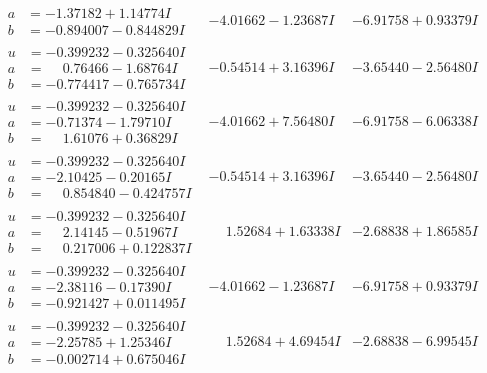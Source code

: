 \documentclass[1p]{elsarticle_modified}
\theoremstyle{definition}
\begin{document}
$$\begin{array}{c|c|c}
\begin{aligned}
a &= -1.37182 + 1.14774 I \\
b &= -0.894007 - 0.844829 I\end{aligned}
 & -4.01662 - 1.23687 I & -6.91758 + 0.93379 I \\ \hline\begin{aligned}
u &= -0.399232 - 0.325640 I \\
a &= \phantom{-}0.76466 - 1.68764 I \\
b &= -0.774417 - 0.765734 I\end{aligned}
 & -0.54514 + 3.16396 I & -3.65440 - 2.56480 I \\ \hline\begin{aligned}
u &= -0.399232 - 0.325640 I \\
a &= -0.71374 - 1.79710 I \\
b &= \phantom{-}1.61076 + 0.36829 I\end{aligned}
 & -4.01662 + 7.56480 I & -6.91758 - 6.06338 I \\ \hline\begin{aligned}
u &= -0.399232 - 0.325640 I \\
a &= -2.10425 - 0.20165 I \\
b &= \phantom{-}0.854840 - 0.424757 I\end{aligned}
 & -0.54514 + 3.16396 I & -3.65440 - 2.56480 I \\ \hline\begin{aligned}
u &= -0.399232 - 0.325640 I \\
a &= \phantom{-}2.14145 - 0.51967 I \\
b &= \phantom{-}0.217006 + 0.122837 I\end{aligned}
 & \phantom{-}1.52684 + 1.63338 I & -2.68838 + 1.86585 I \\ \hline\begin{aligned}
u &= -0.399232 - 0.325640 I \\
a &= -2.38116 - 0.17390 I \\
b &= -0.921427 + 0.011495 I\end{aligned}
 & -4.01662 - 1.23687 I & -6.91758 + 0.93379 I \\ \hline\begin{aligned}
u &= -0.399232 - 0.325640 I \\
a &= -2.25785 + 1.25346 I \\
b &= -0.002714 + 0.675046 I\end{aligned}
 & \phantom{-}1.52684 + 4.69454 I & -2.68838 - 6.99545 I \\ \hline\begin{aligned}

\end{aligned}
\end{array}$$
\end{document}
